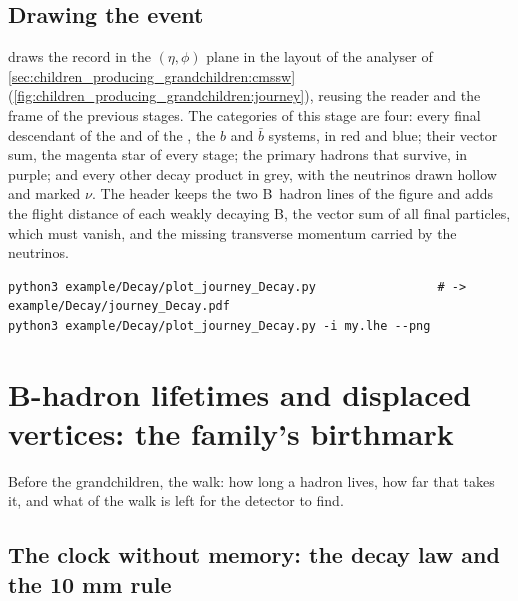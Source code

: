 \subsection{Drawing the event}

 draws the record in the
$(\eta,\phi)$ plane in the layout of the \CMSSW analyser of
\cref{sec:children_producing_grandchildren:cmssw}
(\cref{fig:children_producing_grandchildren:journey}), reusing the reader
and the frame of the previous stages. The categories of this stage are
four: every final descendant of the \Bstarbar and of the \Bstar, the $b$
and $\bar b$ systems, in red and blue; their vector sum, the magenta star
of every stage; the primary hadrons that survive, in purple; and every
other decay product in grey, with the neutrinos drawn hollow and marked
$\nu$. The header keeps the two B~hadron lines of the \CMSSW figure and
adds the flight distance of each weakly decaying B, the vector sum of all
final particles, which must vanish, and the missing transverse momentum
carried by the neutrinos.
\begin{verbatim}
python3 example/Decay/plot_journey_Decay.py                 # -> example/Decay/journey_Decay.pdf
python3 example/Decay/plot_journey_Decay.py -i my.lhe --png
\end{verbatim}

\section{B-hadron lifetimes and displaced vertices: the family's birthmark}
\label{sec:children_producing_grandchildren:b_hadron_lifetimes_and_displaced_vertice}

Before the grandchildren, the walk: how long a hadron lives, how far that
takes it, and what of the walk is left for the detector to find.

\subsection{The clock without memory: the decay law and the 10 mm rule}
\label{sec:children_producing_grandchildren:lifetime}

